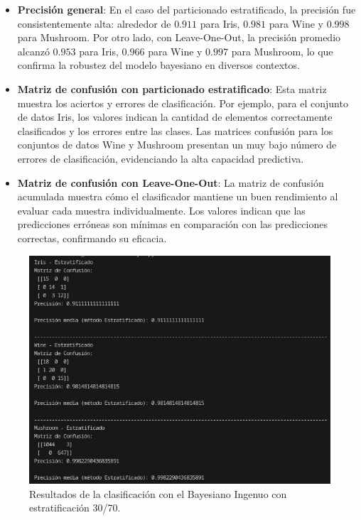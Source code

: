 \documentclass{article}
\begin{document}
    \begin{itemize}
        \item \textbf{Precisión general}: En el caso del particionado estratificado, la precisión fue consistentemente alta: alrededor de $0.911$ para Iris, $0.981$ para Wine y $0.998$ para Mushroom. Por otro lado, con Leave-One-Out, la precisión promedio alcanzó $0.953$ para Iris, $0.966$ para Wine y $0.997$ para Mushroom, lo que confirma la robustez del modelo bayesiano en diversos contextos.
        \item \textbf{Matriz de confusión con particionado estratificado}: Esta matriz muestra los aciertos y errores de clasificación. Por ejemplo, para el conjunto de datos Iris, los valores indican la cantidad de elementos correctamente clasificados y los errores entre las clases. Las matrices confusión para los conjuntos de datos Wine y Mushroom presentan un muy bajo número de errores de clasificación, evidenciando la alta capacidad predictiva.
        \item \textbf{Matriz de confusión con Leave-One-Out}: La matriz de confusión acumulada muestra cómo el clasificador mantiene un buen rendimiento al evaluar cada muestra individualmente. Los valores indican que las predicciones erróneas son mínimas en comparación con las predicciones correctas, confirmando su eficacia.
    \end{itemize}
    \begin{figure}[!h]
        \centering
        \includegraphics[scale=0.5]{Estratificado.jpg}
        \caption{Resultados de la clasificación con el Bayesiano Ingenuo con estratificación 30/70.}
    \end{figure}
\end{document}
